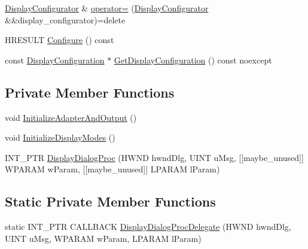 \begin{DoxyCompactItemize}
\hyperlink{classmage_1_1_display_configurator}{Display\+Configurator} \& \hyperlink{classmage_1_1_display_configurator_a9d98a955cdbaf3bfe8913a4b561ad08d}{operator=} (\hyperlink{classmage_1_1_display_configurator}{Display\+Configurator} \&\&display\+\_\+configurator)=delete
\item 
H\+R\+E\+S\+U\+LT \hyperlink{classmage_1_1_display_configurator_aa84373fba5d7806f065f7633a03f7d64}{Configure} () const
\item 
const \hyperlink{structmage_1_1_display_configuration}{Display\+Configuration} $\ast$ \hyperlink{classmage_1_1_display_configurator_a9371158cf1e2686f43ece9e1a53ee3b6}{Get\+Display\+Configuration} () const noexcept
\end{DoxyCompactItemize}
\subsection*{Private Member Functions}
\begin{DoxyCompactItemize}
\item 
void \hyperlink{classmage_1_1_display_configurator_a03fd2c38f6fdb6fbc8ff429a7d0d2a89}{Initialize\+Adapter\+And\+Output} ()
\item 
void \hyperlink{classmage_1_1_display_configurator_a90ecffb8d93768464bb1698531a34db7}{Initialize\+Display\+Modes} ()
\item 
I\+N\+T\+\_\+\+P\+TR \hyperlink{classmage_1_1_display_configurator_a1d84e574699095a994411bbeb058154c}{Display\+Dialog\+Proc} (H\+W\+ND hwnd\+Dlg, U\+I\+NT u\+Msg, \mbox{[}\mbox{[}maybe\+\_\+unused\mbox{]}\mbox{]} W\+P\+A\+R\+AM w\+Param, \mbox{[}\mbox{[}maybe\+\_\+unused\mbox{]}\mbox{]} L\+P\+A\+R\+AM l\+Param)
\end{DoxyCompactItemize}
\subsection*{Static Private Member Functions}
\begin{DoxyCompactItemize}
\item 
static I\+N\+T\+\_\+\+P\+TR C\+A\+L\+L\+B\+A\+CK \hyperlink{classmage_1_1_display_configurator_a3a15e6afa93904c2aaab6c4f5c501fb4}{Display\+Dialog\+Proc\+Delegate} (H\+W\+ND hwnd\+Dlg, U\+I\+NT u\+Msg, W\+P\+A\+R\+AM w\+Param, L\+P\+A\+R\+AM l\+Param)
\end{DoxyCompactItemize}
